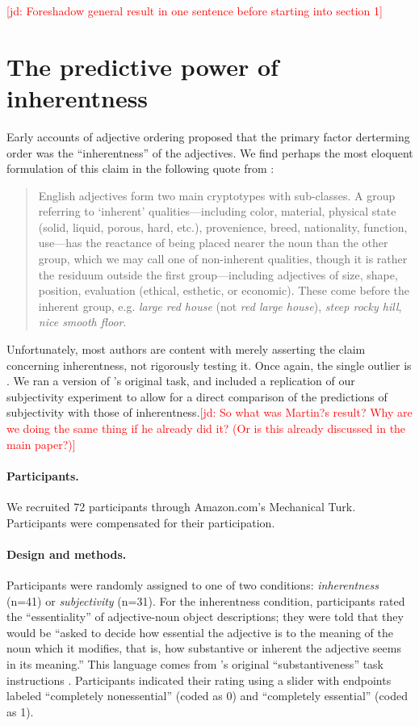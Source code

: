 \documentclass[12pt]{article}
\newcommand{\jd}[1]{\textcolor{red}{[jd: #1]}}
\begin{document}
\jd{Foreshadow general result in one sentence before starting into section 1}

\section{The predictive power of inherentness}

Early accounts of adjective ordering proposed that the primary factor derterming order was the ``inherentness'' of the adjectives. We find perhaps the most eloquent formulation of this claim in the following quote from \cite[p.~5]{whorf1945}: 

\begin{quotation}
English adjectives form two main cryptotypes with sub-classes. A group referring to `inherent' qualities---including color, material, physical state (solid, liquid, porous, hard, etc.), provenience, breed, nationality, function, use---has the reactance of being placed nearer the noun than the other group, which we may call one of non-inherent qualities, though it is rather the residuum outside the first group---including adjectives of size, shape, position, evaluation (ethical, esthetic, or economic). These come before the inherent group, e.g. \emph{large red house} (not \emph{red large house}), \emph{steep rocky hill}, \emph{nice smooth floor}.
\end{quotation}

Unfortunately, most authors are content with merely asserting the claim concerning inherentness, not rigorously testing it. Once again, the single outlier is \cite{martin1969}. We ran a version of \citeauthor{martin1969}'s original task, and included a replication of our subjectivity experiment to allow for a direct comparison of the predictions of subjectivity with those of inherentness.\jd{So what was Martin?s result? Why are we doing the same thing if he already did it? (Or is this already discussed in the main paper?)}

\paragraph{Participants.} We recruited 72 participants through Amazon.com's Mechanical Turk. Participants were compensated for their participation.

\paragraph{Design and methods.} Participants were randomly assigned to one of two conditions: \emph{inherentness} (n=41) or \emph{subjectivity} (n=31). For the inherentness condition, participants rated the ``essentiality'' of adjective-noun object descriptions; they were told that they would be ``asked to decide how essential the adjective is to the meaning of the noun which it modifies, that is, how substantive or inherent the adjective seems in its meaning.'' This language comes from \citeauthor{martin1969}'s original ``substantiveness'' task instructions \citep[Expt.~VII]{martin1969}. Participants indicated their rating using a slider with endpoints labeled ``completely nonessential'' (coded as 0) and ``completely essential'' (coded as 1).
\end{document}
